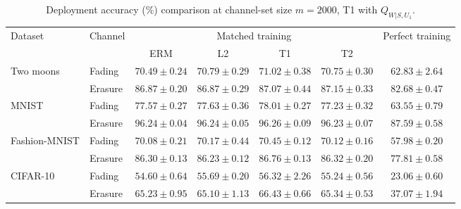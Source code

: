 \begin{table}[htb]
\centering
\caption{Deployment accuracy (\%) comparison at channel-set size $m=2000$, T1 with $Q_{W|S,U_1}$.}
\label{tab:performance}
\begin{tabular*}{\linewidth}{@{\extracolsep{\fill}}llccccc@{}}
\toprule
\multirow{2}{*}{Dataset} & \multirow{2}{*}{Channel}
& \multicolumn{4}{c}{Matched training} & \multirow{2}{*}{Perfect training} \\
\cmidrule(lr){3-6}
& & ERM & L2 & T1 & T2 &  \\
\midrule
\multirow{2}{*}{Two moons}
& Fading
& $70.49\pm0.24$ & $70.79\pm0.29$ & $\mathbf{71.02}\pm0.38$ & $70.75\pm0.30$ & $62.83\pm2.64$ \\
& Erasure
& $86.87\pm0.20$ & $86.87\pm0.29$ & $87.07\pm0.44$ & $\mathbf{87.15}\pm0.33$ & $82.68\pm0.47$ \\
\midrule
\multirow{2}{*}{MNIST}
& Fading
& $77.57\pm0.27$ & $77.63\pm0.36$ & $\mathbf{78.01}\pm0.27$ & $77.23\pm0.32$ & $63.55\pm0.79$ \\
& Erasure
& $96.24\pm0.04$ & $96.24\pm0.05$ & $\mathbf{96.26}\pm0.09$ & $96.23\pm0.07$ & $87.59\pm0.58$ \\
\midrule
\multirow{2}{*}{Fashion-MNIST}
& Fading
& $70.08\pm0.21$ & $70.17\pm0.44$ & $\mathbf{70.45}\pm0.12$ & $70.12\pm0.16$ & $57.98\pm0.20$ \\
& Erasure
& $86.30\pm0.13$ & $86.23\pm0.12$ & $\mathbf{86.76}\pm0.13$ & $86.32\pm0.20$ & $77.81\pm0.58$ \\
\midrule
\multirow{2}{*}{CIFAR-10}
& Fading
& $54.60\pm0.64$ & $55.69\pm0.20$ & $\mathbf{56.32}\pm2.26$ & $55.24\pm0.56$ & $23.06\pm0.60$ \\
& Erasure
& $65.23\pm0.95$ & $65.10\pm1.13$ & $\mathbf{66.43}\pm0.66$ & $65.34\pm0.53$ & $37.07\pm1.94$ \\
\bottomrule
\end{tabular*}
\end{table}
